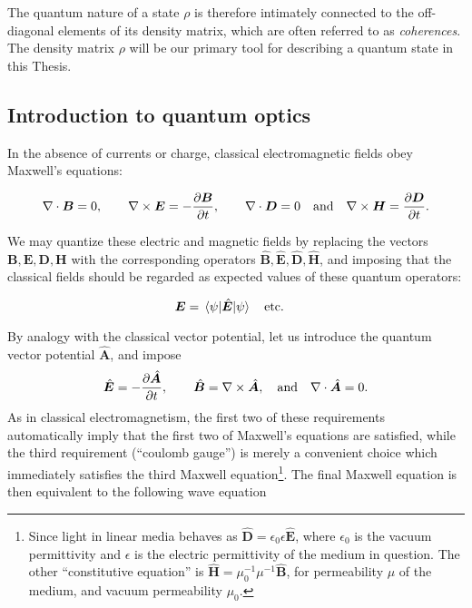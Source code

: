 \noindent The quantum nature of a state $\rho$ is therefore intimately connected to the off-diagonal elements of its density matrix, which are often referred to as \emph{coherences}. The density matrix $\rho$ will be our primary tool for describing a quantum state in this Thesis.



\FloatBarrier
\subsection{Introduction to quantum optics}

In the absence of currents or charge, classical electromagnetic fields obey Maxwell's equations:

\begin{equation}
\nabla \cdot \bm{B} =0,\qq{} \nabla \times \bm{E} = - \frac{\partial \bm{B}}{\partial t},\qq{} \nabla \cdot \bm{D} = 0 \qq{and} \nabla \times \bm{H} = \frac{\partial \bm{D}}{\partial t}. \notag
\end{equation}

\noindent We may quantize these electric and magnetic fields by replacing the vectors $\bm{B}, \bm{E}, \bm{D}, \bm{H}$ with the corresponding operators $\hat{\bm{B}}, \hat{\bm{E}}, \hat{\bm{D}}, \hat{\bm{H}}$, and imposing that the classical fields should be regarded as expected values of these quantum operators:

\begin{equation}
\bm{E} = \ev{\hat{\bm{E}}}{\psi} \qq{etc.}
\end{equation}

\noindent By analogy with the classical vector potential, let us introduce the quantum vector potential $\hat{\bm{A}}$, and impose
\begin{equation}
\hat{\bm{E}} = - \frac{\partial \hat{\bm{A}}}{\partial t}, \qq{}  \hat{\bm{B}} = \nabla \times \hat{\bm{A}}, \qq{and} \nabla \cdot \hat{\bm{A}} = 0.
\end{equation}
As in classical electromagnetism, the first two of these requirements automatically imply that the first two of Maxwell's equations are satisfied, while the third requirement (``coulomb gauge'') is merely a convenient choice which immediately satisfies the third Maxwell equation\footnote{Since light in linear media behaves as $\hat{\bm{D}} = \epsilon_0 \epsilon \hat{\bm{E}}$, where $\epsilon_0$ is the vacuum permittivity and $\epsilon$ is the electric permittivity of the medium in question. The other ``constitutive equation'' is $\hat{\bm{H}} = \mu_0^{-1} \mu^{-1} \hat{\bm{B}}$, for permeability $\mu$ of the medium, and vacuum permeability $\mu_0$.}. The final Maxwell equation is then equivalent to the following wave equation

